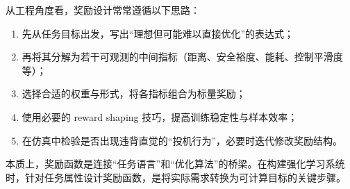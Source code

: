 从工程角度看，奖励设计常常遵循以下思路：

\begin{enumerate}
  \item 先从任务目标出发，写出“理想但可能难以直接优化”的表达式；
  \item 再将其分解为若干可观测的中间指标（距离、安全裕度、能耗、控制平滑度等）；
  \item 选择合适的权重与形式，将各指标组合为标量奖励；
  \item 使用必要的 reward shaping 技巧，提高训练稳定性与样本效率；
  \item 在仿真中检验是否出现违背直觉的“投机行为”，必要时迭代修改奖励结构。
\end{enumerate}

本质上，奖励函数是连接“任务语言”和“优化算法”的桥梁。在构建强化学习系统时，针对任务属性设计奖励函数，是将实际需求转换为可计算目标的关键步骤。
